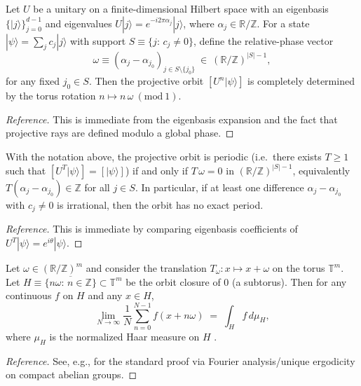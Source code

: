 \begin{proposition}
\label{prop:projective_torus}
Let $U$ be a unitary on a finite-dimensional Hilbert space with an eigenbasis $\{|j\rangle\}_{j=0}^{d-1}$ and eigenvalues $U|j\rangle = e^{-i2\pi \alpha_j}|j\rangle$, where $\alpha_j\in\mathbb{R}/\mathbb{Z}$. For a state $|\psi\rangle=\sum_{j} c_j|j\rangle$ with support $S\equiv\{j:\,c_j\neq 0\}$, define the relative-phase vector
\begin{equation}
    \omega\equiv (\alpha_j-\alpha_{j_0})_{j\in S\setminus\{j_0\}}\ \in\ (\mathbb{R}/\mathbb{Z})^{|S|-1},
\end{equation}
for any fixed $j_0\in S$. Then the projective orbit $[U^n|\psi\rangle]$ is completely determined by the torus rotation $n\mapsto n\,\omega\ (\mathrm{mod}\ 1)$.
\end{proposition}
\begin{proof}[Reference]
This is immediate from the eigenbasis expansion and the fact that projective rays are defined modulo a global phase.
\end{proof}

\begin{proposition}
\label{prop:aperiodic_criterion}
With the notation above, the projective orbit is periodic (i.e.\ there exists $T\ge 1$ such that $[U^T|\psi\rangle]=[|\psi\rangle]$) if and only if $T\,\omega=0$ in $(\mathbb{R}/\mathbb{Z})^{|S|-1}$, equivalently $T(\alpha_j-\alpha_{j_0})\in\mathbb{Z}$ for all $j\in S$.
In particular, if at least one difference $\alpha_j-\alpha_{j_0}$ with $c_j\neq 0$ is irrational, then the orbit has no exact period.
\end{proposition}
\begin{proof}[Reference]
This is immediate by comparing eigenbasis coefficients of $U^T|\psi\rangle=e^{i\theta}|\psi\rangle$.
\end{proof}

\begin{theorem}
\label{thm:equidistribution_closure}
Let $\omega\in(\mathbb{R}/\mathbb{Z})^m$ and consider the translation $T_\omega:x\mapsto x+\omega$ on the torus $\mathbb{T}^m$. Let $H\equiv \overline{\{n\omega:\,n\in\mathbb{Z}\}}\subset\mathbb{T}^m$ be the orbit closure of $0$ (a subtorus). Then for any continuous $f$ on $H$ and any $x\in H$,
\begin{equation}
    \lim_{N\to\infty}\frac{1}{N}\sum_{n=0}^{N-1} f(x+n\omega) \;=\; \int_H f\,d\mu_H,
\end{equation}
where $\mu_H$ is the normalized Haar measure on $H$ \cite{KuipersNiederreiter1974,Weyl1916}.
\end{theorem}
\begin{proof}[Reference]
See, e.g., \cite{Weyl1916,KuipersNiederreiter1974} for the standard proof via Fourier analysis/unique ergodicity on compact abelian groups.
\end{proof}

